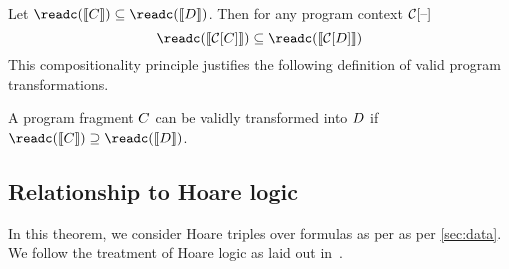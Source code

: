 
Let $\readc(\sem{\aCmd}) \subseteq \readc(\sem{\bCmd})$.  Then for any program context $\aCtxt\hole{}$
\[ \readc(\sem{\aCtxt\hole{\aCmd}}) \subseteq \readc(\sem{\aCtxt\hole{\bCmd}}) \]
This compositionality principle justifies the following definition of valid program transformations. 
\begin{definition}
A program fragment $C$ can be validly transformed into $D$ if  $\readc(\sem{\aCmd}) \supseteq  \readc(\sem{\bCmd})$.
\end{definition}


\subsection{Relationship to Hoare logic}
In this theorem, we consider Hoare triples over formulas as per as per \textsection\ref{sec:data}.  We follow the treatment of Hoare logic as laid out in~\citet{gordonHoare}.  

